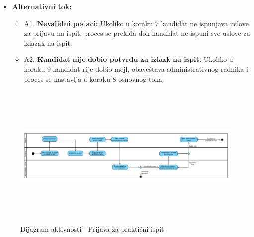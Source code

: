 \begin{itemize}
\item \textbf{Alternativni tok:}  
   \begin{itemize}
   \item A1. \textbf{Nevalidni podaci:}
  Ukoliko u koraku 7 kandidat ne ispunjava uslove za prijavu na ispit, proces se prekida dok kandidat ne ispuni sve uslove za izlazak na ispit.
  \item A2. \textbf{Kandidat nije dobio potvrdu za izlazk na ispit:}
  Ukoliko u koraku 9 kandidat nije dobio mejl, obaveštava administrativnog radnika i proces se nastavlja u koraku 8 osnovnog toka.
   \end{itemize}

\end{itemize}  

\begin{figure}[H]
  \begin{center}
      \includegraphics[width=140mm, height=70mm]{Diagrams/dijagram_aktivnosti_prijava_za_praktican_ispit.png}
  \end{center}
  \caption {Dijagram aktivnosti - Prijava za praktični ispit}
  \label{activity_prijava_za_prakticni_ispit}

\end{figure}
